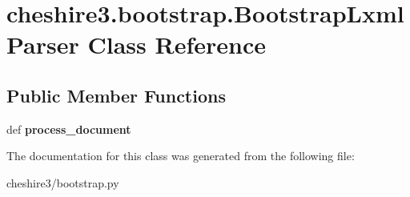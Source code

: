 \hypertarget{classcheshire3_1_1bootstrap_1_1_bootstrap_lxml_parser}{\section{cheshire3.\-bootstrap.\-Bootstrap\-Lxml\-Parser Class Reference}
\label{classcheshire3_1_1bootstrap_1_1_bootstrap_lxml_parser}
}
\subsection*{Public Member Functions}
\begin{DoxyCompactItemize}
\item 
\hypertarget{classcheshire3_1_1bootstrap_1_1_bootstrap_lxml_parser_a8ff94bf89c81ccd90ef6d7ee69df9285}{def {\bfseries process\-\_\-document}}\label{classcheshire3_1_1bootstrap_1_1_bootstrap_lxml_parser_a8ff94bf89c81ccd90ef6d7ee69df9285}

\end{DoxyCompactItemize}


The documentation for this class was generated from the following file\-:\begin{DoxyCompactItemize}
\item 
cheshire3/bootstrap.\-py\end{DoxyCompactItemize}
